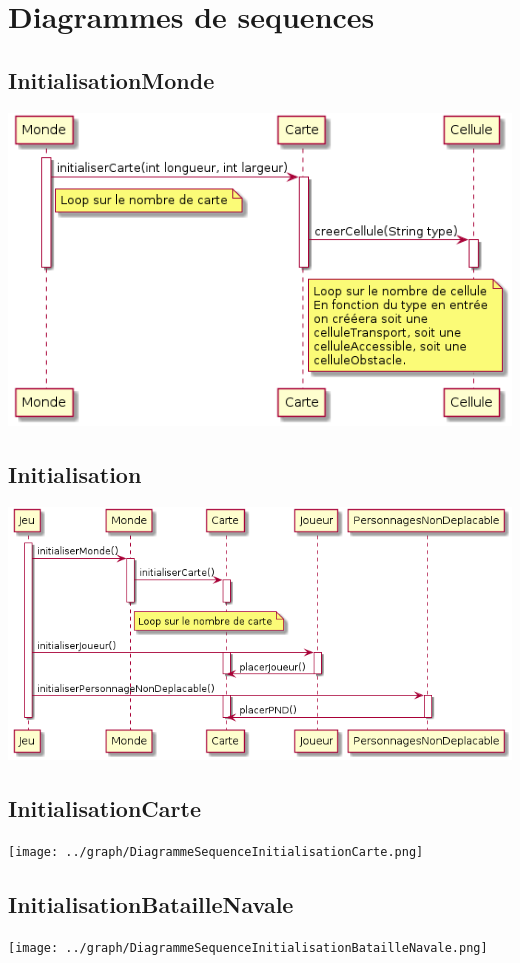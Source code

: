 \chapter{Diagrammes de sequences}
    \section{InitialisationMonde}
        \includegraphics[scale=0.5]{../graph/DiagrammeSequenceInitialisationMonde.png}
    \section{Initialisation}
        \includegraphics[scale=0.5]{../graph/DiagrammeSequenceInitialisation.png}
    \section{InitialisationCarte}
        \texttt{[image: ../graph/DiagrammeSequenceInitialisationCarte.png]}
    \section{InitialisationBatailleNavale}
        \texttt{[image: ../graph/DiagrammeSequenceInitialisationBatailleNavale.png]}
